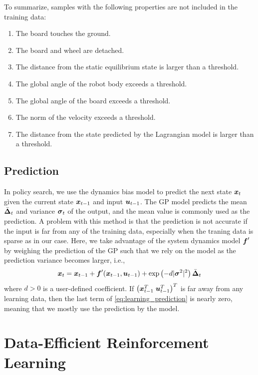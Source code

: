 To summarize, samples with the following properties are not included in
the training data:
\begin{enumerate}
\item The board touches the ground.
\item The board and wheel are detached.
\item The distance from the static equilibrium state is larger than a
	  threshold.
\item The global angle of the robot body exceeds a threshold.
\item The global angle of the board exceeds a threshold.
\item The norm of the velocity exceeds a threshold.
\item The distance from the state predicted by the Lagrangian model is
	  larger than a threshold.
\end{enumerate}


\subsection{Prediction}

In policy search, we use the dynamics bias model to predict the next
state $\mbox{\boldmath \(x\)}_t$ given the current state $\mbox{\boldmath \(x\)}_{t-1}$ and input
$\mbox{\boldmath \(u\)}_{t-1}$.
The GP model predicts the mean
$\bar{\mbox{\boldmath \(\Delta\)}}_t$ and variance $\mbox{\boldmath \(\sigma\)}_t$ of the
output, and the mean value is commonly used as the prediction.
A problem with this method is that the prediction is not accurate if the
input is far from any of the training data, especially when the traning
data is sparse as in our case.
Here, we take advantage of the system dynamics model $\mbox{\boldmath \(f\)}'$ by
weighing the prediction of the GP such that we rely on the model as the
prediction variance becomes larger, i.e.,
\begin{equation}
\mbox{\boldmath \(x\)}_t = \mbox{\boldmath \(x\)}_{t-1} + \mbox{\boldmath \(f\)}'(\mbox{\boldmath \(x\)}_{t-1}, \mbox{\boldmath \(u\)}_{t-1}) +
 \exp\left( -d |\mbox{\boldmath \(\sigma\)}^2|^2\right) \bar{\mbox{\boldmath \(\Delta\)}}_t
\label{eq:learning_prediction}
\end{equation}
where $d>0$ is a user-defined coefficient.
If $\left(\mbox{\boldmath \(x\)}_{t-1}^T\;\mbox{\boldmath \(u\)}_{t-1}^T\right)^T$ is far away
from any learning data, then the last term of \eqref{eq:learning_prediction} is
nearly zero, meaning that we mostly use the prediction by the model.

\section{Data-Efficient Reinforcement Learning} \label{sec:learning_policy-optim}


